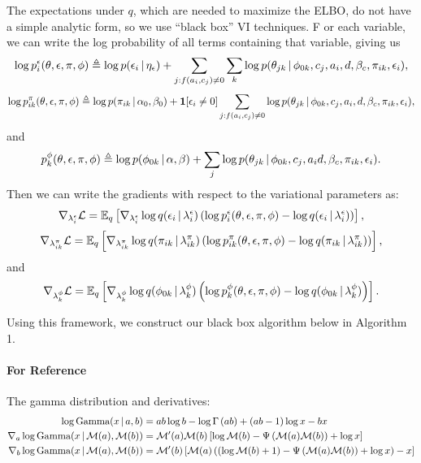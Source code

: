 The expectations under $q$, which are needed to maximize the ELBO, do not have a simple analytic form, so we use ``black box'' VI techniques.
F or each variable, we can write the log probability of all terms containing that variable, giving us 
\[\log p^\epsilon_{i}(\theta, \epsilon, \pi, \phi) \triangleq \log p(\epsilon_{i} \, | \, \eta_\epsilon) + \sum_{j : f(a_i, c_j) \neq 0}\sum_k\log p(\theta_{jk} \, | \, \phi_{0k}, c_j, a_i, d, \beta_c, \pi_{ik}, \epsilon_i),\]
\[\log p^\pi_{ik}(\theta, \epsilon, \pi, \phi) \triangleq \log p(\pi_{ik} \, | \, \alpha_0, \beta_0) + \mathbf{1}[\epsilon_i \neq 0] \sum_{j : f(a_i, c_j) \neq 0}\log p(\theta_{jk} \, | \, \phi_{0k}, c_j, a_i, d, \beta_c, \pi_{ik}, \epsilon_i),\]
and
\[p^\phi_{k}(\theta, \epsilon, \pi, \phi) \triangleq \log p(\phi_{0k} \, | \, \alpha, \beta) + \sum_{j} \log p(\theta_{jk} \, | \, \phi_{0k}, c_j, a_i d, \beta_c, \pi_{ik}, \epsilon_i).\]
Then we can write the gradients with respect to the variational parameters as:
\[\nabla_{\lambda^\epsilon_{i}} \mathcal{L} = \mathbb{E}_q \left[ \nabla_{\lambda^\epsilon_{i}} \log q(\epsilon_{i} \, | \, \lambda^\epsilon_{i}) \left( \log p^\epsilon_{i}(\theta, \epsilon, \pi, \phi) - \log q(\epsilon_{i} \, | \, \lambda^\epsilon_{i}) \right)\right],\]
\[\nabla_{\lambda^\pi_{ik}} \mathcal{L} = \mathbb{E}_q \left[ \nabla_{\lambda^\pi_{ik}} \log q(\pi_{ik} \, | \, \lambda^\pi_{ik}) \left( \log p^\pi_{ik}(\theta, \epsilon, \pi, \phi) - \log q(\pi_{ik} \, | \, \lambda^\pi_{ik}) \right)\right],\]
and
\[\nabla_{\lambda^\phi_{k}} \mathcal{L} = \mathbb{E}_q \left[ \nabla_{\lambda^\phi_{k}} \log q(\phi_{0k} \, | \, \lambda^\phi_{k}) \left( \log p^\phi_{k}(\theta, \epsilon, \pi, \phi) - \log q(\phi_{0k} \, | \, \lambda^\phi_{k}) \right)\right].\]

Using this framework, we construct our black box algorithm below in Algorithm 1.

\paragraph{For Reference}
The gamma distribution and derivatives:
\begin{align}
\log\mbox{Gamma}(x \, | \, a,b) & = ab\log b - \log\Gamma \left(ab\right) +(ab-1)\log x - bx \label{eq:gamma}\\
\nabla_a \log\mbox{Gamma}(x \, | \, \mathcal{M}(a), \mathcal{M}(b)) &= 
\mathcal{M}'(a) \mathcal{M}(b) \left[ \log \mathcal{M}(b) - \Psi \left(\mathcal{M}(a)\mathcal{M}(b)\right) + \log x\right] \label{eq:dgammaA}
\\
\nabla_b \log\mbox{Gamma}(x \, | \, \mathcal{M}(a), \mathcal{M}(b)) &= 
\mathcal{M}'(b) \left[ \mathcal{M}(a) \left((\log \mathcal{M}(b) + 1) - \Psi \left(\mathcal{M}(a)\mathcal{M}(b)\right) + \log x\right) - x\right]\label{eq:dgammaB}
\end{align}

